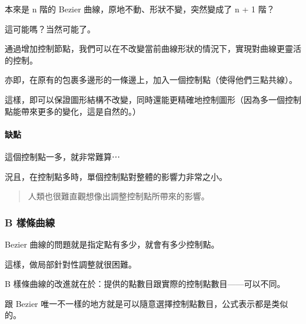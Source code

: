 \documentclass[
]{article}
\begin{document}
本來是 n 階的 Bezier 曲線，原地不動、形狀不變，突然變成了 n + 1 階？

這可能嗎？当然可能了。

通過增加控制節點，我們可以在不改變當前曲線形狀的情況下，實現對曲線更靈活的控制。

亦即，在原有的包裹多邊形的一條邊上，加入一個控制點（使得他們三點共線）。

這樣，即可以保證圖形結構不改變，同時還能更精確地控制圖形（因為多一個控制點能帶來更多的變化，這是自然的。）

\hypertarget{header-n38}{%
\paragraph{缺點}\label{header-n38}}

這個控制點一多，就非常難算⋯

況且，在控制點多時，單個控制點對整體的影響力非常之小。

\begin{quote}
人類也很難直觀想像出調整控制點所帶來的影響。
\end{quote}

\hypertarget{header-n43}{%
\subsubsection{B 樣條曲線}\label{header-n43}}

Bezier 曲線的問題就是指定點有多少，就會有多少控制點。

這樣，做局部針對性調整就很困難。

B 樣條曲線的改進就在於：提供的點數目跟實際的控制點數目------可以不同。

跟 Bezier
唯一不一樣的地方就是可以隨意選擇控制點數目，公式表示都是类似的。
\end{document}
